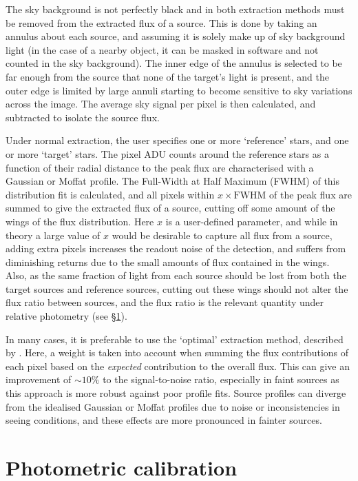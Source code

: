The sky background is not perfectly black and in both extraction methods must be removed from the extracted flux of a source. This is done by taking an annulus about each source, and assuming it is solely make up of sky background light (in the case of a nearby object, it can be masked in software and not counted in the sky background). The inner edge of the annulus is selected to be far enough from the source that none of the target's light is present, and the outer edge is limited by large annuli starting to become sensitive to sky variations across the image. The average sky signal per pixel is then calculated, and subtracted to isolate the source flux.

Under normal extraction, the user specifies one or more `reference' stars, and one or more `target' stars. The pixel ADU counts around the reference stars as a function of their radial distance to the peak flux are characterised with a Gaussian or Moffat profile. The Full-Width at Half Maximum (FWHM) of this distribution fit is calculated, and all pixels within $x \times \mathrm{FWHM}$ of the peak flux are summed to give the extracted flux of a source, cutting off some amount of the wings of the flux distribution. Here $x$ is a user-defined parameter, and while in theory a large value of $x$ would be desirable to capture all flux from a source, adding extra pixels increases the readout noise of the detection, and suffers from diminishing returns due to the small amounts of flux contained in the wings.
Also, as the same fraction of light from each source should be lost from both the target sources and reference sources, cutting out these wings should not alter the flux ratio between sources, and the flux ratio is the relevant quantity under relative photometry (see \S\ref{sect:observations:photometric extraction and calibration}).

In many cases, it is preferable to use the `optimal' extraction method, described by \citet{naylor1998}. Here, a weight is taken into account when summing the flux contributions of each pixel based on the {\it expected} contribution to the overall flux. This can give an improvement of $\sim 10\%$ to the signal-to-noise ratio, especially in faint sources as this approach is more robust against poor profile fits. Source profiles can diverge from the idealised Gaussian or Moffat profiles due to noise or inconsistencies in seeing conditions, and these effects are more pronounced in fainter sources. 



\section{Photometric calibration}
\label{sect:observations:photometric extraction and calibration}

